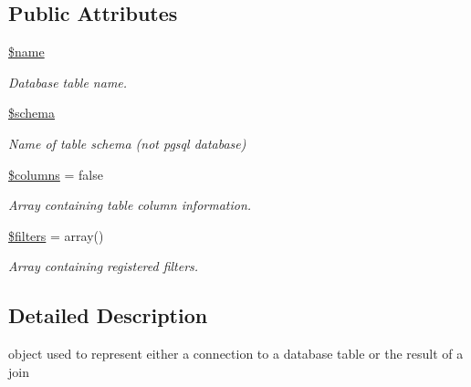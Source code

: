 \subsection*{Public Attributes}
\begin{DoxyCompactItemize}
\item 
\hypertarget{classentity_ae35f24992703a71e751ed6afa981380f}{}\hyperlink{classentity_ae35f24992703a71e751ed6afa981380f}{\$name}\label{classentity_ae35f24992703a71e751ed6afa981380f}

\begin{DoxyCompactList}\small\item\em Database table name. \end{DoxyCompactList}\item 
\hypertarget{classentity_a8ce4fa273c17d68fff1dd173a704b109}{}\hyperlink{classentity_a8ce4fa273c17d68fff1dd173a704b109}{\$schema}\label{classentity_a8ce4fa273c17d68fff1dd173a704b109}

\begin{DoxyCompactList}\small\item\em Name of table schema (not pgsql database) \end{DoxyCompactList}\item 
\hypertarget{classentity_a4d04649f2fb9b66924ce6a0f23633541}{}\hyperlink{classentity_a4d04649f2fb9b66924ce6a0f23633541}{\$columns} = false\label{classentity_a4d04649f2fb9b66924ce6a0f23633541}

\begin{DoxyCompactList}\small\item\em Array containing table column information. \end{DoxyCompactList}\item 
\hypertarget{classentity_a59f264aa884262d60bf96c1b750ffba8}{}\hyperlink{classentity_a59f264aa884262d60bf96c1b750ffba8}{\$filters} = array()\label{classentity_a59f264aa884262d60bf96c1b750ffba8}

\begin{DoxyCompactList}\small\item\em Array containing registered filters. \end{DoxyCompactList}\end{DoxyCompactItemize}


\subsection{Detailed Description}
object used to represent either a connection to a database table or the result of a join 

